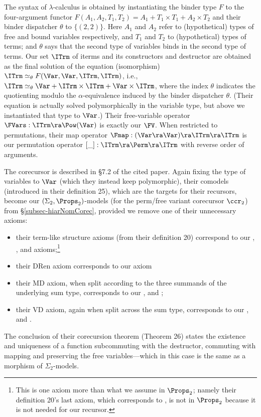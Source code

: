 The syntax of $\lambda$-calculus is obtained by instantiating the \cite{DBLP:journals/pacmpl/BlanchetteGPT19}  binder type $F$ to the four-argument functor $F(A_1,A_2,T_1,T_2) = A_1 + T_1 \times T_1 + A_2 \times T_2$ and their binder dispatcher $\theta$ to $\{(2,2)\}$.  Here $A_1$ and $A_2$ refer to (hypothetical) types of free and  bound variables respectively, and $T_1$ and $T_2$ to (hypothetical) types of terms; and $\theta$ says that the second type of variables binds in the second type of terms. Our set $\ITrm$ of iterms and its constructors and destructor are obtained as the final solution of the equation (isomorphism)  $\ITrm \simeq_{\theta}  F(\Var,\Var,\ITrm,\ITrm)$, i.e., $\ITrm \simeq_{\theta}  \Var + \ITrm \times \ITrm + \Var \times \ITrm$, 
where the index $\theta$ indicates the quotienting modulo the $\alpha$-equivalence induced by the binder dispatcher $\theta$.  (Their equation is actually solved polymorphically in the variable type, but above we instantiated that type to $\Var$.) Their free-variable 
operator $\FVars : \ITrm \ra \Pow(\Var)$ is exactly our $\FV$. 
When restricted to permutations, %
their map operator 
$\Fmap : (\Var \ra \Var) \ra \ITrm \ra \ITrm$ 
is our permutation operator $[\_] : \ITrm \ra \Perm \ra \ITrm$ with reverse order of arguments. 

The \cite{DBLP:journals/pacmpl/BlanchetteGPT19} corecursor is described in \S7.2 of the cited paper.  Again fixing the type of variables to $\Var$ (which they instead keep polymorphic), 
their comodels (introduced in their definition 25), which are the targets for their recursors, become our $(\Sigma_2,\Props_2)$-models (for the perm/free variant corecursor $\ccr_2$) from \S\ref{subsec-hiarNomCorec}, provided we remove one of their unnecessary axioms:  %
\begin{itemize}
	\item their term-like structure axioms (from their definition 20) correspond to our \PmId{}, \PmCp{}, \PmFv{} and \FvPm{} axioms;\footnote{This is one axiom more than what we assume in $\Props_2$; namely their definition 20's last axiom, which corresponds to \FvPm{}, is not in $\Props_2$ because it is not needed for our recursor.}
	\item their \textsf{DRen} axiom corresponds to our \IPmBvr{} axiom
	\item their \textsf{MD} axiom, when split according to the three summands of the underlying sum type, corresponds to our \IPmVr{}, \IPmAp{} and \IPmLm{}; 
	\item their \textsf{VD} axiom, again when split across the sum type, corresponds to our \IFrVr{}, \IFrAp{} and \IFrLm{}.
\end{itemize}
%
The conclusion of their corecursion theorem (Theorem 26) states the existence and uniqueness of a function subcommuting with the destructor, commuting with mapping and preserving the free variables---which in this case is the same as a morphism of $\Sigma_2$-models.




